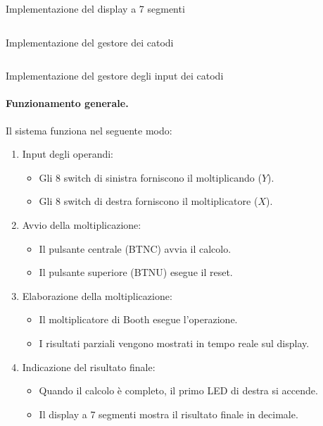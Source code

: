 \begin{code}
    \inputminted{vhdl}{vhdl/booth_multiplier_seven_segments_display.vhd}
    \caption{Implementazione del display a 7 segmenti}
    \label{cod:booth_multiplier_seven_segments_display}
\end{code}

\begin{code}
    \inputminted{vhdl}{vhdl/booth_multiplier_cathodes_manager.vhd}
    \caption{Implementazione del gestore dei catodi}
    \label{cod:booth_multiplier_cathodes_manager}
\end{code}

\begin{code}
    \inputminted{vhdl}{vhdl/booth_multiplier_cathodes_input_manager.vhd}
    \caption{Implementazione del gestore degli input dei catodi}
    \label{cod:booth_multiplier_cathodes_input_manager}
\end{code}

\paragraph{Funzionamento generale.} Il sistema funziona nel seguente modo:

\begin{enumerate}
    \item Input degli operandi:
    \begin{itemize}
        \item Gli 8 switch di sinistra forniscono il moltiplicando ($Y$).
        \item Gli 8 switch di destra forniscono il moltiplicatore ($X$).
    \end{itemize}
    \item Avvio della moltiplicazione:
    \begin{itemize}
        \item Il pulsante centrale (BTNC) avvia il calcolo.
        \item Il pulsante superiore (BTNU) esegue il reset.
    \end{itemize}
    \item Elaborazione della moltiplicazione:
    \begin{itemize}
        \item Il moltiplicatore di Booth esegue l’operazione.
        \item I risultati parziali vengono mostrati in tempo reale sul display.
    \end{itemize}
    \item Indicazione del risultato finale:
    \begin{itemize}
        \item Quando il calcolo è completo, il primo LED di destra si accende.
        \item Il display a 7 segmenti mostra il risultato finale in decimale.
    \end{itemize}
\end{enumerate}

